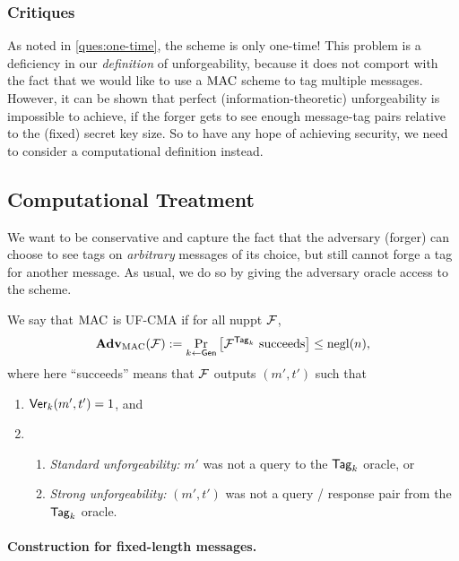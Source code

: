 \documentclass[11pt]{article}
\begin{document}
\subsubsection{Critiques}
\label{sec:critiques-info-mac}

As noted in \cref{ques:one-time}, the scheme is only one-time!
This problem is a deficiency in our \emph{definition} of
unforgeability, because it does not comport with the fact that we
would like to use a $\text{MAC}$ scheme to tag multiple messages.  However,
it can be shown that perfect (information-theoretic) unforgeability is
impossible to achieve, if the forger gets to see enough message-tag
pairs relative to the (fixed) secret key size.  So to have any hope of
achieving security, we need to consider a computational definition
instead.

\subsection{Computational Treatment}
\label{sec:comp-mac}

We want to be conservative and capture the fact that the adversary
(forger) can choose to see tags on \emph{arbitrary} messages of its
choice, but still cannot forge a tag for another message.  As usual,
we do so by giving the adversary oracle access to the scheme.

\begin{definition}
  \label{def:uf-mca}
  We say that $\text{MAC}$ is UF-CMA if for all nuppt $\mathcal{F}$,
  \[
  \mathbf{Adv}_{\text{MAC}}(\mathcal{F}) := \Pr_{k \gets \mathsf{Gen}}\left[\mathcal{F}^{\mathsf{Tag}_k}
  \text{ succeeds} \right] \leq \operatorname{negl}(n),
  \]
  where here ``succeeds'' means that $\mathcal{F}$ outputs $(m',t')$ such that
  \begin{enumerate}
  \item $\mathsf{Ver}_k(m',t') = 1$, and
  \item 
    \begin{enumerate}
    \item \emph{Standard unforgeability:} $m'$ was not a query to the
      $\mathsf{Tag}_{k}$ oracle, or
    \item \emph{Strong unforgeability:} $(m',t')$ was not a query /
      response pair from the $\mathsf{Tag}_{k}$ oracle.
    \end{enumerate}
  \end{enumerate}
\end{definition}

\paragraph{Construction for fixed-length messages.}
\end{document}
